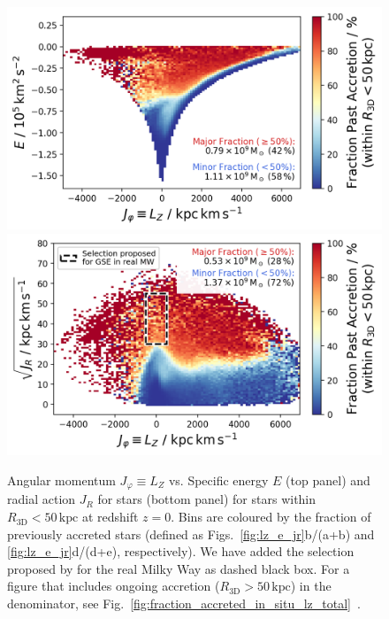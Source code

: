 \documentclass[fleqn,usenatbib]{mnras}
\begin{document}
\begin{figure}
    \centering
    \includegraphics[width=\linewidth]{figures/fraction_accreted_in_situ_lz_e.png}
    \includegraphics[width=\linewidth]{figures/fraction_accreted_in_situ_lz_jr.png}
    \caption{Angular momentum $J_\varphi \equiv L_Z$ vs. Specific energy $E$ (top panel) and radial action $J_R$ for stars (bottom panel) for stars within $R_\mathrm{3D} < 50\,\mathrm{kpc}$ at redshift $z=0$. Bins are coloured by the fraction of previously accreted stars (defined as Figs.~\ref{fig:lz_e_jr}b/(a+b) and \ref{fig:lz_e_jr}d/(d+e), respectively). We have added the selection proposed by \citet{Feuillet2020} for the real Milky Way as dashed black box. For a figure that includes ongoing accretion ($R_\mathrm{3D} > 50\,\mathrm{kpc}$) in the denominator, see Fig.~\ref{fig:fraction_accreted_in_situ_lz_total}~\href{https://github.com/svenbuder/gse_nihaouhd/tree/main/figures}{\faGithub}.}
    \label{fig:fraction_accreted_in_situ_lz}
\end{figure}
\end{document}
